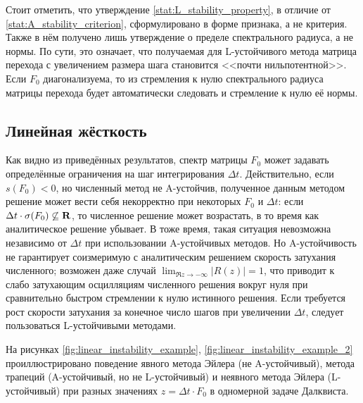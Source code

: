 Стоит отметить, что утверждение \ref{stat:L_stability_property}, в отличие от \ref{stat:A_stability_criterion}, сформулировано в форме признака, а не критерия.
Также в нём получено лишь утверждение о пределе спектрального радиуса, а не нормы.
По сути, это означает, что получаемая для L-устойчивого метода матрица перехода с увеличением размера шага становится <<почти нильпотентной>>.
Если $ F_0 $ диагонализуема, то из стремления к нулю спектрального радиуса матрицы перехода будет автоматически следовать и стремление к нулю её нормы.


\subsection{Линейная жёсткость}
\label{subsec:linear_stiffness}


Как видно из приведённых результатов, спектр матрицы $ F_0 $ может задавать определённые ограничения на шаг интегрирования $ \Delta t $.
Действительно, если $ s(F_0) < 0 $, но численный метод не A-устойчив, полученное данным методом решение может вести себя некорректно при некоторых $ F_0 $ и $ \Delta t $:
если $ \Delta t \cdot \sigma(F_0) \not\subseteq \mathbf{R} $, то численное решение может возрастать, в то время как аналитическое решение убывает.
В тоже время, такая ситуация невозможна независимо от $ \Delta t $ при использовании A-устойчивых методов.
Но A-устойчивость не гарантирует соизмеримую с аналитическим решением скорость затухания численного; возможен даже случай $ \displaystyle \lim_{\Re z \to -\infty} |R(z)| = 1 $,
что приводит к слабо затухающим осцилляциям численного решения вокруг нуля при сравнительно быстром стремлении к нулю истинного решения.
Если требуется рост скорости затухания за конечное число шагов при увеличении $ \Delta t $, следует пользоваться L-устойчивыми методами.

На рисунках \ref{fig:linear_instability_example}, \ref{fig:linear_instability_example_2} проиллюстрировано поведение явного метода Эйлера (не A-ус\-той\-чи\-вый),
метода трапеций (A-устойчивый, но не L-устойчивый) и неявного метода Эйлера (L-устойчивый) при разных значениях $ z = \Delta t \cdot F_0 $ в одномерной задаче Далквиста.

